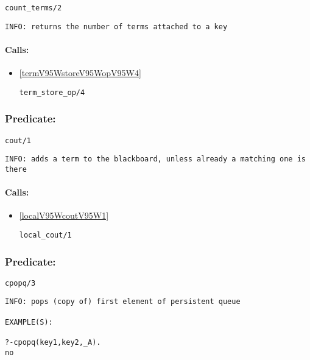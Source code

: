 \begin{verbatim}
count_terms/2
\end{verbatim}

{\small \begin{verbatim}
INFO: returns the number of terms attached to a key

\end{verbatim}}
\paragraph{Calls:} 
\begin{itemize}
\item \ref{termV95WstoreV95WopV95W4} 
\begin{verbatim}
term_store_op/4
\end{verbatim}

\end{itemize}

\subsubsection{Predicate:} \label{coutV95W1}

\begin{verbatim}
cout/1
\end{verbatim}

{\small \begin{verbatim}
INFO: adds a term to the blackboard, unless already a matching one is there

\end{verbatim}}
\paragraph{Calls:} 
\begin{itemize}
\item \ref{localV95WcoutV95W1} 
\begin{verbatim}
local_cout/1
\end{verbatim}

\end{itemize}

\subsubsection{Predicate:} \label{cpopqV95W3}

\begin{verbatim}
cpopq/3
\end{verbatim}

{\small \begin{verbatim}
INFO: pops (copy of) first element of persistent queue

EXAMPLE(S):

?-cpopq(key1,key2,_A).
no

\end{verbatim}}
